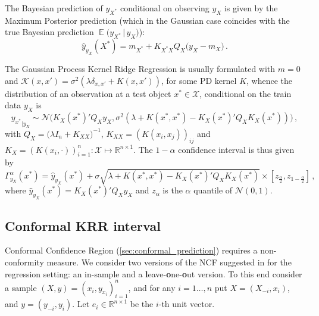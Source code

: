 \documentclass[a4paper]{article}
\newcommand{\ex}{\mathop{\mathbb{E}}\nolimits}
\newcommand{\Ncal}{\mathcal{N}}
\newcommand{\Kcal}{\mathcal{K}}
\newcommand{\Xcal}{\mathcal{X}}
\newcommand{\Real}{\mathbb{R}}
\begin{document}
The Bayesian prediction of $y_{X^*}$ conditional on observing $y_X$ is given by
the Maximum Posterior prediction (which in the Gaussian case coincides with the
true Bayesian prediction $\ex\bigl(y_{X^*}\,|\, y_X\bigr)$):
\begin{equation*}
  \hat{y}_{y_X}(X^*) = m_{X^*} + K_{X^*X} Q_X \bigl(y_X - m_X\bigr) \,.
\end{equation*}

The Gaussian Process Kernel Ridge Regression is usually formulated with $m=0$ and
$\Kcal(x,x') = \sigma^2(\lambda \delta_{x,x'} + K(x,x'))$, for some PD kernel $K$,
whence the distribution of an observation at a test object $x^*\in \Xcal$, conditional
on the train data $y_X$ is
\begin{equation} \label{eq:gp_cond_dist}
{y_{x^*}}_{|y_X}
  \sim \Ncal\bigl(
    K_X(x^*)' Q_X y_X,
    \sigma^2( \lambda + K(x^*, x^*) - K_X(x^*)' Q_X K_X(x^*) )
  \bigr) \,,
\end{equation}
with $Q_X = \bigl(\lambda I_n + K_{XX}\bigr)^{-1}$, $K_{XX} = (K(x_i,x_j))_{ij}$ and
$K_X = (K(x_i, \cdot))_{i=1}^n: \Xcal \mapsto \Real^{n\times1}$. The $1-\alpha$
confidence interval is thus given by
\begin{equation} \label{eq:gp_conf_int}
\Gamma^\alpha_{y_X}(x^*)
  = \hat{y}_{y_X}(x^*)
  + \sigma \sqrt{\lambda + K(x^*, x^*) - K_X(x^*)' Q_X K_X(x^*)}
  \times [z_{\frac{\alpha}{2}}, z_{1-\frac{\alpha}{2}}]
  \,,
\end{equation}
where $\hat{y}_{y_X}(x^*) = K_X(x^*)' Q_X y_X$ and $z_\alpha$ is the $\alpha$ quantile
of $\Ncal(0, 1)$.


\subsection{Conformal KRR interval} %
\label{sub:conformal_krr_interval}

Conformal Confidence Region (\ref{sec:conformal_prediction}) requires a non-conformity
measure. We consider two versions of the NCF suggested in \cite{vovk2005} for the
regression setting: an in-sample and a \textbf{l}eave-\textbf{o}ne-\textbf{o}ut version.
To this end consider a sample $(X, y) = (x_i, y_{x_i})_{i=1}^n$, and for any $i=1\ldots, n$
put $X = (X_{-i}, x_i)$, and $y = (y_{-i}, y_i)$. Let $e_i\in \Real^{n\times 1}$ be
the $i$-th unit vector.
\end{document}
